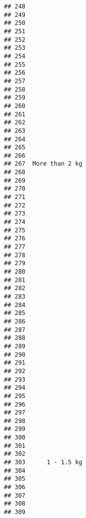 \documentclass[
]{article}
\begin{document}
\begin{verbatim}
## 248                                   
## 249                                   
## 250                                   
## 251                                   
## 252                                   
## 253                                   
## 254                                   
## 255                                   
## 256                                   
## 257                                   
## 258                                   
## 259                                   
## 260                                   
## 261                                   
## 262                                   
## 263                                   
## 264                                   
## 265                                   
## 266                                   
## 267  More than 2 kg                   
## 268                                   
## 269                                   
## 270                                   
## 271                                   
## 272                                   
## 273                                   
## 274                                   
## 275                                   
## 276                                   
## 277                                   
## 278                                   
## 279                                   
## 280                                   
## 281                                   
## 282                                   
## 283                                   
## 284                                   
## 285                                   
## 286                                   
## 287                                   
## 288                                   
## 289                                   
## 290                                   
## 291                                   
## 292                                   
## 293                                   
## 294                                   
## 295                                   
## 296                                   
## 297                                   
## 298                                   
## 299                                   
## 300                                   
## 301                                   
## 302                                   
## 303      1 - 1.5 kg                   
## 304                                   
## 305                                   
## 306                                   
## 307                                   
## 308                                   
## 309                                   

\end{verbatim}
\end{document}
